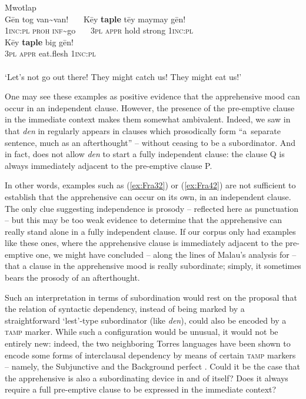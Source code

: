 \documentclass[output=paper,colorlinks,citecolor=brown]{langscibook}
\begin{document}
\ea \label{ex:Fra42} \textnormal{Mwotlap}  \\
\gll Gēn tog van\textasciitilde van! ~~~Kēy \textbf{taple} tēy maymay gēn!\\
\textsc{1inc:pl} \textsc{proh} \textsc{inf}\textasciitilde go ~~~\textsc{3pl} \textsc{appr} hold strong \textsc{1inc:pl} \\
\gll Kēy \textbf{taple} big gēn! \\
\textsc{3pl} \textsc{appr} eat.flesh \textsc{1inc:pl} \\
 \\
`Let's not go out there! They might catch us! They might eat us!' 
\z


One may see these examples as positive evidence that the apprehensive mood can occur in an independent clause. However, the presence of the pre-emptive clause in the immediate context makes them somewhat ambivalent. Indeed, we saw in  that \textit{den} in  regularly appears in clauses which prosodically form ``a~separate sentence, much as an afterthought'' \citep[679]{Malau2016} -- without ceasing to be a subordinator. And in fact,  does not allow \textit{den} to start a fully independent clause: the clause Q is always immediately adjacent to the pre-emptive clause P.

In other words, examples such as (\ref{ex:Fra32}) or (\ref{ex:Fra42}) are not sufficient to establish that the  apprehensive can occur on its own, in an independent clause. The only clue suggesting independence is prosody -- reflected here as punctuation -- but this may be too weak evidence to determine that the apprehensive can really stand alone in a fully independent clause. If our corpus only had examples like these ones, where the apprehensive clause is immediately adjacent to the pre-emptive one, we might have concluded -- along the lines of Malau's analysis for  -- that a clause in the apprehensive mood is really subordinate; simply, it sometimes bears the prosody of an afterthought. 

Such an interpretation in terms of subordination would rest on the proposal that the relation of syntactic dependency, instead of being marked by a straightforward `lest'-type subordinator (like  \textit{den}), could also be encoded by a \textsc{tamp} marker. While such a configuration would be unusual, it would not be entirely new: indeed, the two neighboring Torres languages have been shown to encode some forms of interclausal dependency by means of certain \textsc{tamp} markers -- namely, the Subjunctive and the Background perfect \citep{François2010}. Could it be the case that the  apprehensive is also a subordinating device in and of itself? Does it always require a full pre-emptive clause to be expressed in the immediate context?
\end{document}
